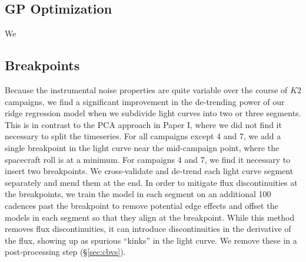 \documentclass[]{emulateapj}
\begin{document}
\subsection{GP Optimization}
\label{sec:impl_gp}
We 

\subsection{Breakpoints}
\label{sec:impl_breakpoints}
Because the instrumental noise properties are quite variable over the course of $K2$ 
campaigns, we find a significant improvement in the de-trending power of our ridge
regression model when we subdivide light curves into two or three segments. This is in contrast to
the PCA approach in Paper I, where we did not find it necessary to split the timeseries.
For all campaigns except 4 and 7, we add a single breakpoint in the light curve near the
mid-campaign point, where the spacecraft roll is at a minimum. For campaigns 4 and 7,
we find it necessary to insert two breakpoints. We cross-validate and de-trend each 
light curve segment separately and mend them at the end. In order to mitigate flux
discontinuities at the breakpoints, we train the model in each segment on an additional
100 cadences past the breakpoint to remove potential edge effects and offset the models
in each segment so that they align at the breakpoint.
While this method removes flux discontinuities, it can introduce discontinuities in the
derivative of the flux, showing up as spurious ``kinks'' in the light curve. We 
remove these in a post-processing step (\S\ref{sec:cbvs}).
\end{document}
